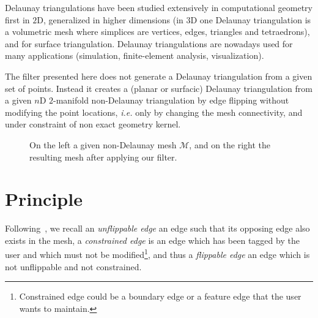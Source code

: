 \documentclass{InsightArticle}
\def \ie {\textit{i.e. }}
\begin{document}
Delaunay triangulations have been studied extensively in computational geometry first in $2$D, generalized in higher dimensions (in $3$D one Delaunay triangulation is a volumetric mesh where simplices are vertices, edges, triangles and tetraedrons), and for surface triangulation. Delaunay triangulations are nowadays used for many applications (simulation, finite-element analysis, visualization).

The filter presented here does not generate a Delaunay triangulation from a given set of points. Instead it creates a (planar or surfacic) Delaunay triangulation from a given $n$D $2$-manifold non-Delaunay triangulation by edge flipping without modifying the point locations, \ie only by changing the mesh connectivity, and under constraint of non exact geometry kernel.

\begin{figure}[ht]
  \centering
  \caption{On the left a given non-Delaunay mesh $\mathcal{M}$, and on the right the resulting mesh after applying our filter.}
  \label{fig:results}
\end{figure}

\section{Principle}
Following~\cite{Dyer2007sgp}, we recall an \emph{unflippable edge} an edge such that its opposing edge also exists in the mesh, a \emph{constrained edge} is an edge which has been tagged by the user and which must not be modified\footnote{Constrained edge could be a boundary edge or a feature edge that the user wants to maintain.}, and thus a \emph{flippable edge} an edge which is not unflippable and not constrained.
\end{document}
